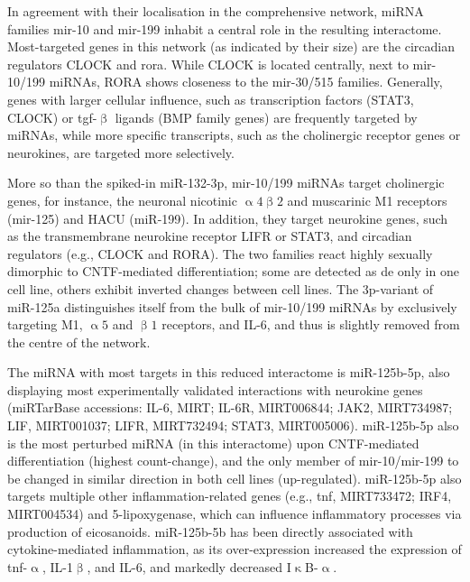 In agreement with their localisation in the comprehensive network, miRNA families mir-10 and mir-199 inhabit a central role in the resulting interactome. Most-targeted genes in this network (as indicated by their size) are the circadian regulators CLOCK and \acs{rora}. While CLOCK is located centrally, next to mir-10/199 miRNAs, RORA shows closeness to the mir-30/515 families. Generally, genes with larger cellular influence, such as transcription factors (STAT3, CLOCK) or \ac{tgf}-$\upbeta$ ligands (BMP family genes) are frequently targeted by miRNAs, while more specific transcripts, such as the cholinergic receptor genes or neurokines, are targeted more selectively. 

More so than the spiked-in miR-132-3p, mir-10/199 miRNAs target cholinergic genes, for instance, the neuronal nicotinic $\upalpha4\upbeta2$ and muscarinic M1 receptors (mir-125) and HACU (miR-199). In addition, they target neurokine genes, such as the transmembrane neurokine receptor LIFR or STAT3, and circadian regulators (e.g., CLOCK and RORA). The two families react highly sexually dimorphic to CNTF-mediated differentiation; some are detected as \ac{de} only in one cell line, others exhibit inverted changes between cell lines. The 3p-variant of miR-125a distinguishes itself from the bulk of mir-10/199 miRNAs by exclusively targeting M1, $\upalpha5$ and $\upbeta1$ receptors, and IL-6, and thus is slightly removed from the centre of the network. 

The miRNA with most targets in this reduced interactome is miR-125b-5p, also displaying most experimentally validated interactions with neurokine genes (miRTarBase accessions: IL-6, MIRT; IL-6R, MIRT006844; JAK2, MIRT734987; LIF, MIRT001037; LIFR, MIRT732494; \linebreak STAT3, MIRT005006). miR-125b-5p also is the most perturbed miRNA (in this interactome) upon CNTF-mediated differentiation (highest count-change), and the only member of mir-10/mir-199 to be changed in similar direction in both cell lines (up-regulated). miR-125b-5p also targets multiple other inflammation-related genes (e.g., \ac{tnf}, MIRT733472; IRF4, MIRT004534) and 5-lipoxygenase, which can influence inflammatory processes via production of eicosanoids.\cite{Busch2015} miR-125b-5b has been directly associated with cytokine-mediated inflammation, as its over-expression increased the expression of \ac{tnf}-$\upalpha$, IL-1$\upbeta$, and IL-6, and markedly decreased I$\upkappa$B-$\upalpha$.\cite{Zhang2017}

